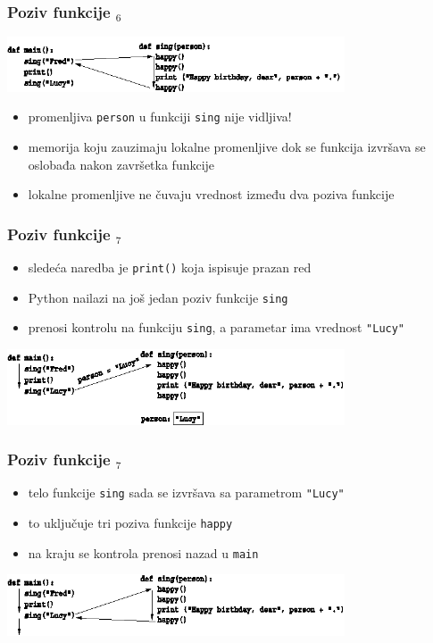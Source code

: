 \documentclass[utf8,compress]{beamer}
\begin{document}
\begin{frame}[fragile]
  \frametitle{Poziv funkcije $_6$}
  \begin{center}
    \includegraphics[width=10cm]{pic06}
  \end{center}
  \begin{itemize}
    \item promenljiva \texttt{person} u funkciji \texttt{sing} nije vidljiva!
    \item memorija koju zauzimaju lokalne promenljive dok se funkcija izvršava se oslobađa nakon završetka funkcije
    \item lokalne promenljive ne čuvaju vrednost između dva poziva funkcije
  \end{itemize}
\end{frame}

\begin{frame}[fragile]
  \frametitle{Poziv funkcije $_7$}
  \begin{itemize}
    \item sledeća naredba je \texttt{print()} koja ispisuje prazan red
    \item Python nailazi na još jedan poziv funkcije \texttt{sing}
    \item prenosi kontrolu na funkciju \texttt{sing}, a parametar ima vrednost \texttt{"Lucy"}
  \end{itemize}
  \begin{center}
    \includegraphics[width=10cm]{pic07}
  \end{center}
\end{frame}

\begin{frame}[fragile]
  \frametitle{Poziv funkcije $_7$}
  \begin{itemize}
    \item telo funkcije \texttt{sing} sada se izvršava sa parametrom \texttt{"Lucy"}
    \item to uključuje tri poziva funkcije \texttt{happy}
    \item na kraju se kontrola prenosi nazad u \texttt{main}
  \end{itemize}
  \begin{center}
    \includegraphics[width=10cm]{pic08}
  \end{center}
\end{frame}
\end{document}
